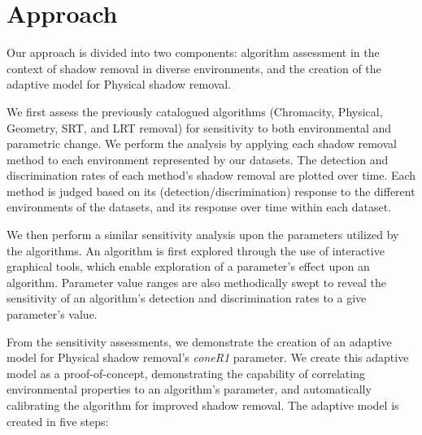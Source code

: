 \section{Approach} \label{section:approach}

Our approach is divided into two components: algorithm assessment in the context of shadow removal in diverse environments, and the creation of the adaptive model for Physical shadow removal.

We first assess the previously catalogued algorithms (Chromacity, Physical, Geometry, SRT, and LRT removal) for sensitivity to both environmental and parametric change. We perform the analysis by applying each shadow removal method to each  environment represented by our datasets. The detection and discrimination rates of each method's shadow removal are plotted over time. Each method is judged based on its (detection/discrimination) response to the different environments of the datasets, and its response over time within each dataset.

We then perform a similar sensitivity analysis upon the parameters utilized by the algorithms. An algorithm is first explored through the use of 
interactive graphical tools, which enable exploration of a parameter's 
effect upon an algorithm.  Parameter value ranges are also methodically 
swept to reveal the sensitivity of an algorithm's detection and 
discrimination rates to a give parameter's value.

From the sensitivity assessments, we demonstrate the creation of an adaptive model for Physical shadow removal's \textit{coneR1} parameter. We create this adaptive model as a proof-of-concept, demonstrating the capability of correlating environmental properties to an algorithm's parameter, and automatically calibrating the algorithm for improved shadow removal. The adaptive model is created in five steps:


